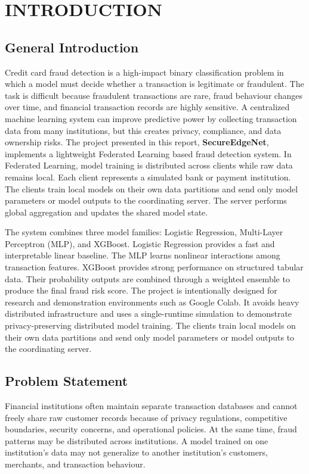 \chapter{INTRODUCTION}
\section{General Introduction}
Credit card fraud detection is a high-impact binary classification problem in which a model must decide whether a transaction is legitimate or fraudulent. The task is difficult because fraudulent transactions are rare, fraud behaviour changes over time, and financial transaction records are highly sensitive. A centralized machine learning system can improve predictive power by collecting transaction data from many institutions, but this creates privacy, compliance, and data ownership risks. The project presented in this report, \textbf{SecureEdgeNet}, implements a lightweight Federated Learning based fraud detection system. In Federated Learning, model training is distributed across clients while raw data remains local. Each client represents a simulated bank or payment institution. The clients train local models on their own data partitions and send only model parameters or model outputs to the coordinating server. The server performs global aggregation and updates the shared model state.


The system combines three model families: Logistic Regression, Multi-Layer Perceptron (MLP), and XGBoost. Logistic Regression provides a fast and interpretable linear baseline. The MLP learns nonlinear interactions among transaction features. XGBoost provides strong performance on structured tabular data. Their probability outputs are combined through a weighted ensemble to produce the final fraud risk score. The project is intentionally designed for research and demonstration environments such as Google Colab. It avoids heavy distributed infrastructure and uses a single-runtime simulation to demonstrate privacy-preserving distributed model training. The clients train local models on their own data partitions and send only model parameters or model outputs to the coordinating server.

\section{Problem Statement}
Financial institutions often maintain separate transaction databases and cannot freely share raw customer records because of privacy regulations, competitive boundaries, security concerns, and operational policies. At the same time, fraud patterns may be distributed across institutions. A model trained on one institution's data may not generalize to another institution's customers, merchants, and transaction behaviour.

